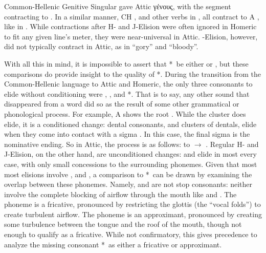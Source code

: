 Common-Hellenic Genitive Singular  gave Attic γένους,\autocite[172]{Sihler_1995} with the segment  contracting to . In a similar manner, CH , and other verbs in , all contract to A , like in . While contractions after H- and J-Elision were often ignored in Homeric to fit any given line's meter, they were near-universal in Attic. \W-Elision, however, did not typically contract in Attic, as in  ``gory'' and  ``bloody''.

With all this in mind, it is impossible to assert that *\w\ be either  or , but these comparisons do provide insight to the quality of *\w. During the transition from the Common-Hellenic language to Attic and Homeric, the only three consonants to elide without conditioning were , , and *\w. That is to say, any other sound that disappeared from a word did so as the result of some other grammatical or phonological process. For example, A  shows the root . While the cluster  does elide, it is a conditioned change: dental consonants, and clusters of dentals, elide when they come into contact with a sigma . In this case, the final sigma  is the nominative ending.  So in Attic, the process is as follows:  to  $\to$ . Regular H- and J-Elision, on the other hand, are unconditioned changes:  and  elide in most every case, with only small concessions to the surrounding phonemes. Given that most most elisions involve , and , a comparison to *\w\ can be drawn by examining the overlap between these phonemes. Namely,  and  are not stop consonants: neither involve the complete blocking of airflow through the mouth like  and . The phoneme  is a fricative, pronounced by restricting the glottis (the ``vocal folds'') to create turbulent airflow. The phoneme  is an approximant, pronounced by creating some turbulence between the tongue and the roof of the mouth, though not enough to qualify as a fricative. While not confirmatory, this gives precedence to analyze the missing consonant *\w\ as either a fricative or approximant.

